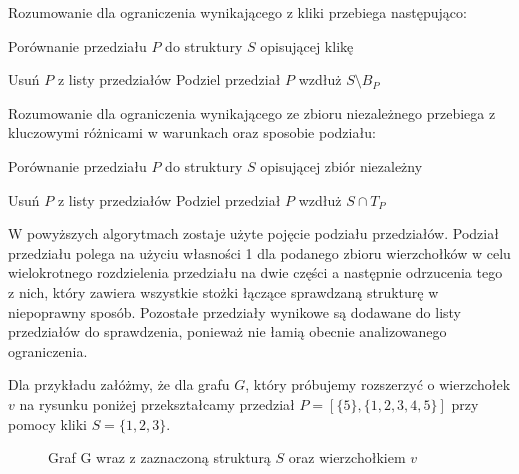 \documentclass[11pt]{article}
\begin{document}
Rozumowanie dla ograniczenia wynikającego z kliki przebiega następująco:
\begin{algorithm}[H]
  \caption{Porównanie przedziału $P$ do struktury $S$ opisującej klikę}
  \begin{algorithmic}
	  \STATE Usuń $P$ z listy przedziałów
	\ELSE
	  \STATE Podziel przedział $P$ wzdłuż $S \setminus B_P  $
  	\ENDIF
  \ENDIF  
  \end{algorithmic}
\end{algorithm}

Rozumowanie dla ograniczenia wynikającego ze zbioru niezależnego przebiega z kluczowymi różnicami w warunkach oraz sposobie podziału:

\begin{algorithm}[H]
  \caption{Porównanie przedziału $P$ do struktury $S$ opisującej zbiór niezależny}
  \begin{algorithmic}
	  \STATE Usuń $P$ z listy przedziałów
	\ELSE
	  \STATE Podziel przedział $P$ wzdłuż $S \cap T_P  $
  	\ENDIF
  \ENDIF  
  \end{algorithmic}
\end{algorithm}

W powyższych algorytmach zostaje użyte pojęcie podziału przedziałów. Podział przedziału polega na  użyciu własności 1 dla podanego zbioru wierzchołków w celu wielokrotnego rozdzielenia przedziału na dwie części a następnie odrzucenia tego z nich, który zawiera wszystkie stożki łączące sprawdzaną strukturę w niepoprawny sposób. Pozostałe przedziały wynikowe są dodawane do listy przedziałów do sprawdzenia, ponieważ nie łamią obecnie analizowanego ograniczenia. 

Dla przykładu załóżmy, że dla grafu $G$, który próbujemy rozszerzyć o wierzchołek $v$ na rysunku poniżej przekształcamy przedział $P =[\{5\},\{1,2,3,4,5\}]$ przy pomocy kliki $S = \{1,2,3\}$.
\begin{figure}[H]
  \centering
    \caption{Graf G wraz z zaznaczoną strukturą $S$ oraz wierzchołkiem $v$}
 \end{figure}
 
\end{document}
